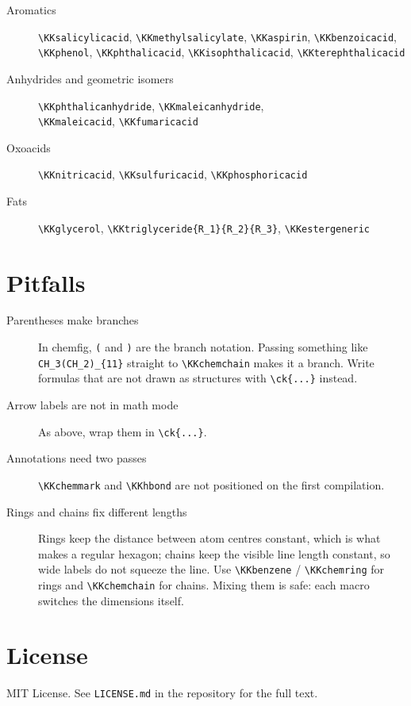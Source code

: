\documentclass[paper=a4paper,fontsize=10pt]{jlreq}
\begin{document}
\begin{description}
\item[Aromatics] \verb|\KKsalicylicacid|, \verb|\KKmethylsalicylate|, \verb|\KKaspirin|,
      \verb|\KKbenzoicacid|, \verb|\KKphenol|, \verb|\KKphthalicacid|,
      \verb|\KKisophthalicacid|, \verb|\KKterephthalicacid|
\item[Anhydrides and geometric isomers] \verb|\KKphthalicanhydride|,
      \verb|\KKmaleicanhydride|,\\
      \verb|\KKmaleicacid|, \verb|\KKfumaricacid|
\item[Oxoacids] \verb|\KKnitricacid|, \verb|\KKsulfuricacid|, \verb|\KKphosphoricacid|
\item[Fats] \verb|\KKglycerol|, \verb|\KKtriglyceride{R_1}{R_2}{R_3}|, \verb|\KKestergeneric|
\end{description}

\begin{center}
\KKmaleicacid\qquad\KKfumaricacid
\end{center}

\section{Pitfalls}

\begin{description}
\item[Parentheses make branches] In \textsf{chemfig}, \verb|(| and \verb|)| are the
      branch notation. Passing something like \verb|CH_3(CH_2)_{11}| straight to
      \verb|\KKchemchain| makes it a branch. Write formulas that are not drawn as
      structures with \verb|\ck{...}| instead.
\item[Arrow labels are not in math mode] As above, wrap them in \verb|\ck{...}|.
\item[Annotations need two passes] \verb|\KKchemmark| and \verb|\KKhbond| are not
      positioned on the first compilation.
\item[Rings and chains fix different lengths] Rings keep the distance between atom
      centres constant, which is what makes a regular hexagon; chains keep the
      visible line length constant, so wide labels do not squeeze the line. Use
      \verb|\KKbenzene| / \verb|\KKchemring| for rings and \verb|\KKchemchain| for
      chains. Mixing them is safe: each macro switches the dimensions itself.
\end{description}

\section{License}

MIT License. See \verb|LICENSE.md| in the repository for the full text.
\end{document}
